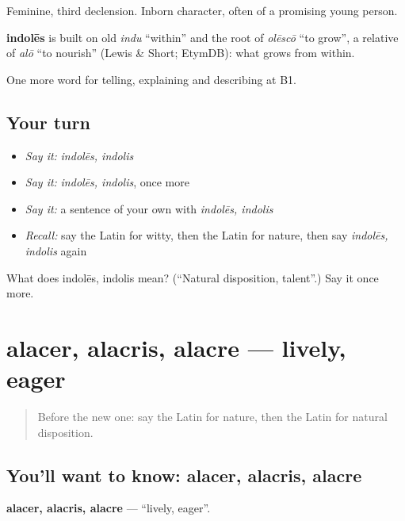 Feminine, third declension. Inborn character, often of a promising young person.

\begin{cousinweb}
\textbf{indolēs} is built on old \emph{indu} \textquotedblleft{}within\textquotedblright{} and the root of \emph{olēscō} \textquotedblleft{}to grow\textquotedblright{}, a relative of \emph{alō} \textquotedblleft{}to nourish\textquotedblright{} (Lewis \& Short; EtymDB): what grows from within.
\end{cousinweb}

\begin{grammarlens}[title={What you've built}]
One more word for telling, explaining and describing at B1.
\end{grammarlens}

\subsection*{Your turn}
\begin{itemize}
\raggedright
  \item \emph{Say it:} \emph{indolēs, indolis}
  \item \emph{Say it:} \emph{indolēs, indolis}, once more
  \item \emph{Say it:} a sentence of your own with \emph{indolēs, indolis}
  \item \emph{Recall:} say the Latin for witty, then the Latin for nature, then say \emph{indolēs, indolis} again
\end{itemize}

\begin{tcolorbox}[breakable,colback=teal!4,colframe=teal!35!black,title={Before you move on}]
What does indolēs, indolis mean? (\textquotedblleft{}Natural disposition, talent\textquotedblright{}.) Say it once more.
\end{tcolorbox}
\section[alacer, alacris, alacre]{alacer, alacris, alacre — lively, eager}

\label{lesson:LA-C503-alacer}



\begin{quote}
Before the new one: say the Latin for nature, then the Latin for natural disposition.
\end{quote}

\subsection*{You'll want to know: alacer, alacris, alacre}
\textbf{alacer, alacris, alacre} — \textquotedblleft{}lively, eager\textquotedblright{}.

